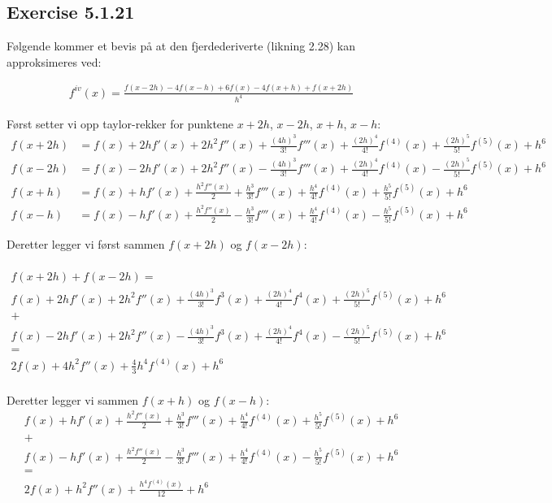 \subsection{Exercise 5.1.21} 
\label{sec:exercise_5_1_21}
Følgende kommer et bevis på at den fjerdederiverte (likning 2.28) kan approksimeres ved: 

\begin{align}
    f^{iv}(x)=\frac{f(x-2h)-4f(x-h)+6f(x)-4f(x+h)+f(x+2h)}{h^4} \label{eq21:proove}
\end{align}

Først setter vi opp taylor-rekker for punktene $x+2h$, $x-2h$, $x+h$, $x-h$: 
\begin{align}
    f(x+2h)&=f(x)+2hf'(x)+2h^2f''(x)+\frac{(4h)^3}{3!}f'''(x)+\frac{(2h)^4}{4!}f^{(4)}(x)+\frac{(2h)^5}{5!}f^{(5)}(x)+h^6\nonumber\\ 
    f(x-2h)&=f(x)-2hf'(x)+2h^2f''(x)-\frac{(4h)^3}{3!}f'''(x)+\frac{(2h)^4}{4!}f^{(4)}(x)-\frac{(2h)^5}{5!}f^{(5)}(x)+h^6\nonumber\\
    f(x+h)&=f(x)+hf'(x)+\frac{h^2f''(x)}{2}+\frac{h^3}{3!}f'''(x)+\frac{h^4}{4!}f^{(4)}(x)+\frac{h^5}{5!}f^{(5)}(x)+h^6\nonumber\\
    f(x-h)&=f(x)-hf'(x)+\frac{h^2f''(x)}{2}-\frac{h^3}{3!}f'''(x)+\frac{h^4}{4!}f^{(4)}(x)-\frac{h^5}{5!}f^{(5)}(x)+h^6\label{Theory:taylorrekker}
\end{align}

Deretter legger vi først sammen $f(x+2h)$ og $f(x-2h)$: 

\begin{multline}
    \\
    f(x+2h)+f(x-2h)= \\
    f(x)+2hf'(x)+2h^2f''(x)+\frac{(4h)^3}{3!}f^3(x)+\frac{(2h)^4}{4!}f^{4}(x)+\frac{(2h)^5}{5!}f^{(5)}(x)+h^6 \\
    + \\
  	f(x)-2hf'(x)+2h^2f''(x)-\frac{(4h)^3}{3!}f^3(x)+\frac{(2h)^4}{4!}f^{4}(x)-\frac{(2h)^5}{5!}f^{(5)}(x)+h^6\nonumber \\
  	=\\
  	2f(x)+4h^2f''(x)+\frac{4}{3}h^4f^{(4)}(x)+h^6 \nonumber\\
\end{multline}

Deretter legger vi sammen $f(x+h)$ og $f(x-h)$: 
\begin{multline}
	f(x)+hf'(x)+\frac{h^2f''(x)}{2}+\frac{h^3}{3!}f'''(x)+\frac{h^4}{4!}f^{(4)}(x)+\frac{h^5}{5!}f^{(5)}(x)+h^6\\
	+\\
	f(x)-hf'(x)+\frac{h^2f''(x)}{2}-\frac{h^3}{3!}f'''(x)+\frac{h^4}{4!}f^{(4)}(x)-\frac{h^5}{5!}f^{(5)}(x)+h^6\\
	=\\
	2f(x)+h^2f''(x)+\frac{h^4f^{(4)}(x)}{12} + h^6 \nonumber \\
\end{multline}

